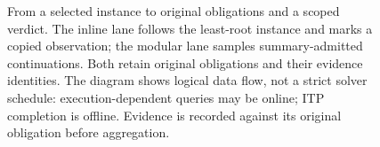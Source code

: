 \begin{figure}[t]
\centering

\caption{From a selected instance to original obligations and a scoped verdict.
The inline lane follows the least-root instance and marks a copied observation;
the modular lane samples
summary-admitted continuations. Both retain original obligations and their
evidence identities. The diagram shows logical data flow, not a strict solver
schedule: execution-dependent queries may be online; ITP completion is offline.
Evidence is recorded against its original obligation before aggregation.}
\label{fig:overview}
\end{figure}
